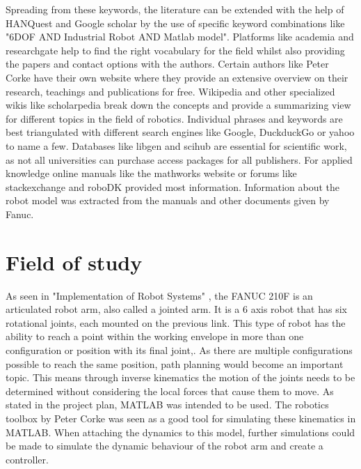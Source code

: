 Spreading from these keywords, the literature can be extended with the help of HANQuest and Google scholar by the use of specific keyword combinations like "6DOF AND Industrial Robot AND Matlab model". Platforms like academia and researchgate help to find the right vocabulary for the field whilst also providing the papers and contact options with the authors. Certain authors like Peter Corke have their own website where they provide an extensive overview on their research, teachings and publications for free. Wikipedia and other specialized wikis like scholarpedia break down the concepts and provide a summarizing view for different topics in the field of robotics. Individual phrases and keywords are best triangulated with different search engines like Google, DuckduckGo or yahoo to name a few. Databases like libgen and scihub are essential for scientific work, as not all universities can purchase access packages for all publishers. For applied knowledge online manuals like the mathworks website  or forums like stackexchange and roboDK provided most information. Information about the robot model was extracted from the manuals and other documents given by Fanuc.




\section{Field of study}

As seen in "Implementation of Robot Systems" \cite{IndustrialRobotArm}, the FANUC 210F is an articulated robot arm, also called a jointed arm. It is a 6 axis robot that has six rotational \gls{joints}, each mounted on the previous \gls{link}. %
This type of robot has the ability to reach a point within the working envelope in more than one configuration or position with its final joint,. 
As there are multiple configurations possible to reach the same position, path planning would become an important topic. 
This means through inverse kinematics  the motion of the \gls{joints} needs to be determined without considering the local forces that cause them to move.
As stated in the project plan, MATLAB was intended to be used.
The robotics toolbox by Peter Corke was seen as a good tool for simulating these kinematics in MATLAB. 
When attaching the dynamics to this model, further simulations could be made to simulate the dynamic behaviour of the robot arm and create a controller. 


